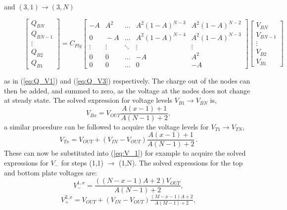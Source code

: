 \documentclass[conference]{IEEEtran}
\begin{document}
	and $(3,1)\rightarrow(3,N)$ 
	\begin{figure}
	\begin{equation}
	\begin{bmatrix}
	Q_{BN} \\
	Q_{BN-1} \\
	\vdots\\
	Q_{B2} \\ 
	Q_{B1}
	\end{bmatrix}
	=
	C_{Fly}
	\begin{bmatrix}
	-A \!& A^2 & \dots & A^2(1\!-\!A)^{N-3} & A^2(1\!-\!A)^{N-2} \\
	0 \!& \!-A & \dots & A^2(1\!-\!A)^{N-4} & A^2(1\!-\!A)^{N-3}\\
	\vdots & \vdots & \ddots & \vdots & \vdots \\
	0 \!& 0 \!& \dots & -A & A^2\\ 
	0 \!& 0 \!& \dots & 0 & -A 
	\end{bmatrix}\!\begin{bmatrix}
	V_{BN} \\
	V_{BN-1} \\
	\vdots \\
	V_{B2} \\
	V_{B1}
	\end{bmatrix}
	\label{eq:Q_V3}
	\end{equation}
\end{figure}
	as in (\ref{eq:Q_V1}) and (\ref{eq:Q_V3}) respectively.
	The charge out of the nodes can then be added, and summed to zero, as the voltage at the nodes does not change at steady state. The solved expression for voltage levels $V_{B1} \rightarrow V_{BN}$ is,
	\begin{equation}
	V_{Bx} = V_{OUT}\frac{A(x-1) + 1}{A(N-1) + 2},
	\end{equation}
	a similar procedure can be followed to acquire the voltage levels for $V_{T1} \rightarrow V_{TN}$,
	\begin{equation}
	V_{Tx} = V_{OUT} + (V_{IN} - V_{OUT})\frac{A(x-1) + 1}{A(N-1) + 2}\,.
	\end{equation}
	These can now be substituted into (\ref{eq:V_1}) for example to acquire the solved expressions for $V_-$ for steps (1,1) $\rightarrow$ (1,N).
	The solved expressions for the top and bottom plate voltages are:
	\begin{equation}
	V_{-}^{1,x} = \frac{((N-x-1)A + 2)V_{OUT}}{A(N-1) + 2},
	\end{equation}
	\begin{equation}
	V_{+}^{2,x} = V_{OUT} + (V_{IN} -V_{OUT})\tfrac{(M-x-1)A + 2}{A(M-1) + 2},
	\end{equation}
\end{document}
